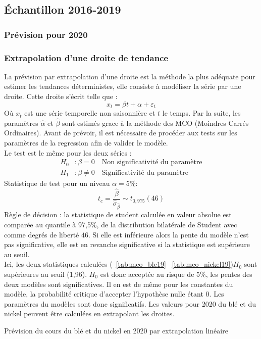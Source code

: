 \subsection{Échantillon 2016-2019}
\subsubsection{Prévision pour 2020}
\subsubsection*{Extrapolation d'une droite de tendance} 
La prévision par extrapolation d'une droite est la méthode la plus adéquate pour estimer les tendances déterministes, elle consiste à modéliser la série par une droite.
Cette droite s'écrit telle que :
\begin{equation*}
    x_{t} = \beta t + \alpha + \varepsilon_{t}
\end{equation*}
Où $x_{t}$ est une série temporelle non saisonnière et $t$ le temps. Par la suite, les paramètres $\hat{\alpha}$ et $\hat{\beta}$ sont estimés grace à la méthode des MCO 
(Moindres Carrés Ordinaires). Avant de prévoir, il est nécessaire de procéder aux tests sur les paramètres de la regression afin de valider le modèle.\\[11pt]
Le test est le même pour les deux séries :
\begin{equation*}
    \begin{split}
        H_{0} &: \beta = 0     \quad \text{Non significativité du paramètre} \\
        H_{1} &: \beta \neq 0  \quad \text{Significativité du paramètre}
    \end{split}
\end{equation*}
Statistique de test pour un niveau $\alpha = 5\%$:
\begin{equation*}
    t_{c} = \frac{\hat{\beta}}{\hat{\sigma}_{\hat{\beta}}}\sim t_{0,975}(46)
\end{equation*}
Règle de décision : la statistique de student calculée en valeur absolue est comparée au quantile à 97,5\%, de la distribution bilatérale de Student avec comme 
degrés de liberté $46$. Si elle est inférieure alors la pente du modèle n'est pas significative, elle est en revanche significative si la statistique est 
supérieure au seuil.\\[11pt]
Ici, les deux statistiques calculées (~\ref{tab:mco_ble19} ~\ref{tab:mco_nickel19})$H_{0}$ sont supérieures au seuil (1,96). $H_{0}$ est donc acceptée au risque de 5\%, 
les pentes des deux modèles sont significatives. Il en est de même pour les constantes du modèle, la probabilité critique d'accepter l'hypothèse nulle étant 0. Les 
paramètres du modèles sont donc significatifs. Les valeurs pour 2020 du blé et du nickel peuvent être calculées en extrapolant les droites.\\[11pt]
\begin{table}[H]
        \centering
        \caption{Prévision du cours du blé et du nickel en 2020 par extrapolation linéaire}
        \sffamily
        
\end{table}


